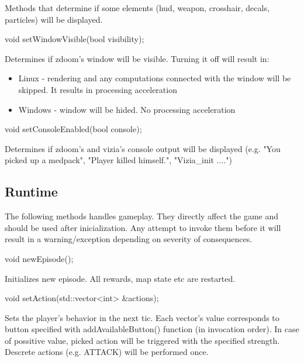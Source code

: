 Methods that determine if some elements (hud, weapon, crosshair, decals, particles) will be displayed.


\vspace{20pt}
\begin{clinee}
void setWindowVisible(bool visibility);
\end{clinee}

Determines if zdoom's window will be visible.
Turning it off will result in:
\begin{itemize}
\item Linux - rendering and any computations connected with the window will be skipped. It results in processing acceleration
\item Windows - window will be hided. No processing acceleration
\end{itemize}


\vspace{20pt}
\begin{clinee}
void setConsoleEnabled(bool console);
\end{clinee}

Determines if zdoom's and vizia's console output will be displayed (e.g. "You picked up a medpack", "Player killed himself.", "Vizia\_init ....")


\vspace{20pt}
\subsection{Runtime}
The following methods handles gameplay. They directly affect the game and should be used after inicialization. 
Any attempt to invoke them before it will result in a warning/exception depending on severity of consequences. 


\vspace{20pt}
\begin{clinee}
void newEpisode();
\end{clinee}

Initializes new episode. All rewards, map state etc are restarted.


\vspace{20pt}
\begin{clinee}
	void setAction(std::vector<int> &actions);
\end{clinee}

Sets the player's behavior in the next tic.
Each vector's value corresponds to button specified with addAvailableButton() function (in invocation order).
In case of possitive value, picked action will be triggered with the specified strength. Descrete actions (e.g. ATTACK) will be performed once.


